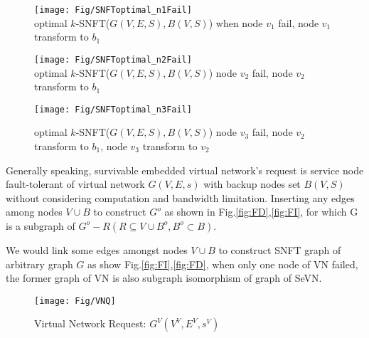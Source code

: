 \begin{figure*}[tp]
\centering
\begin{minipage}[t]{0.3\linewidth}
\centering
\texttt{[image: Fig/SNFToptimal\_n1Fail]}\\
\caption{optimal $k$-SNFT($G(V,E,S),B(V,S)$) when node $v_1$ fail, node $v_1$ transform to $b_1$}\label{fig:SNFToptimal_n1Fail}
\end{minipage}
\hfill
\begin{minipage}[t]{0.3\linewidth}
\centering
\texttt{[image: Fig/SNFToptimal\_n2Fail]}\\
\caption{optimal $k$-SNFT($G(V,E,S),B(V,S)$) node $v_2$ fail, node $v_2$ transform to $b_1$}\label{fig:SNFToptimal_n2Fail}
\end{minipage}
\hfill
\begin{minipage}[t]{0.3\linewidth}
\centering
\texttt{[image: Fig/SNFToptimal\_n3Fail]}\\
\caption{optimal $k$-SNFT($G(V,E,S),B(V,S)$) node $v_3$ fail, node $v_2$ transform to $b_1$, node $v_3$ transform to $v_2$}\label{fig:SNFToptimal_n3Fail}
\end{minipage}
\end{figure*}


Generally speaking, survivable embedded virtual network's request is service node fault-tolerant of virtual network $G(V,E,s)$ with backup nodes set $B(V,S)$ without considering computation and bandwidth limitation. Inserting any edges among nodes $V\cup B$ to construct $G^o$ as shown in Fig.\ref{fig:FD},\ref{fig:FI}, for which G is a subgraph of $G^o-R(R \subseteq V\cup B^o,B^o\subset B)$.

We would link some edges amongst nodes $V\cup B$ to construct SNFT graph of arbitrary graph $G$ as show Fig.\ref{fig:FI},\ref{fig:FD}, when only one node of VN failed, the former graph of VN is also subgraph isomorphism of graph of SeVN. %

\begin{figure}
\centering
\texttt{[image: Fig/VNQ]}\\
\caption{Virtual Network Request: $G^V (V^V,E^V,s^V)$}\label{fig:VNQ}
\end{figure}

